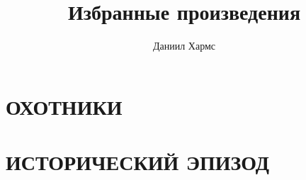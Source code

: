 \documentclass{book}
\begin{document}
\title{Избранные произведения}
\author{Даниил Хармс}
\maketitle

\chapter{ОХОТНИКИ}


\chapter{ИСТОРИЧЕСКИЙ ЭПИЗОД}

\end{document}
